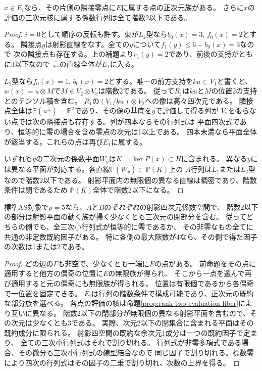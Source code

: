 \begin{proposition}\label{prop:rho-five-propagate-small}
$x\in E_i$なら、その片側の隣接零点に$E$に属する点の正次元族がある。
さらに$x$の評価の三次元核に属する係数行列は全て階数2以下である。
\end{proposition}
\begin{proof}
$i=0$として順序の反転も許す。束が$L_2$型なら$b_0(x)=3$, $f_0(x)=2$とする。
隣接点$y$は射影直線をなす。全ての$y$について$f_1(y)\le6-b_0(x)=3$なので
次の隣接点も存在する。上の補題より$r_1(y)=2$であり、前後の支持がともに3以下なので
この直線全体が$E_1$に入る。

$L_1$型なら$f_0(x)=1$, $b_0(x)=2$とする。唯一の前方支持を$ku\subset V_1$と書くと、
$w(x)=u\otimes M$で$M\in V_2\otimes V_3$は階数2である。
従って$R_1$は$ku$と$M$の位置2の支持とのテンソル積を含む。
$R_1$の$(V_1/ku)\otimes V_2$への像は高々四次元である。
隣接点全体は$\mathbb P(u^\perp)=\mathbb P^2$であり、その像の基底を$y$で評価して得る列が
$V_2$を張らない点では次の隣接点も存在する。列が四本ならその行列式は
平面四次式であり、恒等的に零の場合を含め零点の次元は1以上である。
四本未満なら平面全体が該当する。これらの点は再び$E_1$に属する。

いずれも$y$の二次元の係数平面$W_y$は$K=\ker P(x)\subset H$に含まれる。
異なる$y$には異なる平面が対応する。各直線$\mathbb P(W_y)\subset\mathbb P(K)$上の
$A$行列は$L_1$または$L_2$型なので階数2以下である。
射影平面内の無限個の異なる直線は稠密であり、階数条件は閉であるため
$\mathbb P(K)$全体で階数2以下になる。
\end{proof}

\begin{theorem}[二つの係数空間の三次小行列式に共通因子が必要]\label{thm:rho-five-two-divisors}
標準AS対象で$\rho=5$なら、$A$と$B$の\emph{それぞれ}の射影四次元係数空間で、
階数2以下の部分は射影平面の動く族が掃く少なくとも三次元の閉部分を含む。
従ってどちらの側でも、全三次小行列式が恒等的に零であるか、
その非零なもの全てに共通の非定数既約因子がある。
特に各側の最大階数が4なら、その側で得た因子の次数は1または2である。
\end{theorem}
\begin{proof}
どの辺の$\Gamma$も非空で、少なくとも一端に$E$の点がある。
前命題をその点に適用すると他方の偶奇の位置に$E$の無限族が得られ、
そこから一点を選んで再び適用すると元の偶奇にも無限族が得られる。
位置は有限個であるから各偶奇で一位置を固定できる。
$E_i$は行列の階数条件で構成可能であり、正次元の既約な部分族を選べる。
各点の評価の核は命題\ref{prop:rank-two-evaluation-fiber}により互いに異なる。
階数2以下の閉部分が無限個の異なる射影平面を含むので、その次元は少なくとも3である。
実際、次元2以下の閉集合に含まれる平面はその既約成分に限られる。
射影四空間の既約な余次元1成分は一つの既約因子で定まり、
全ての三次小行列式はそれで割り切れる。
行列式が非零多項式である場合、その微分も三次小行列式の線型結合なので
同じ因子で割り切れる。標数零により四次の行列式はその因子の二乗で割り切れ、次数の上界を得る。
\end{proof}

